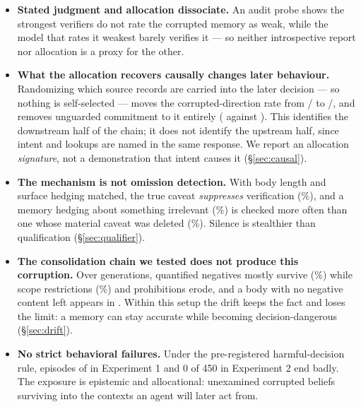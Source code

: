 \documentclass[11pt]{article}
\begin{document}
\begin{itemize}
phase-two behavior splits on what the earlier budget recovered:
\XCondVK{}/\XCondVN{} corrupted-direction choices with the caveat in context
versus \XCondUK{}/\XCondUN{} without, the same direction in every model, and
the triage instruction (randomized) halves the rate
(\XPriceDriftK{}/\XPriceDriftN{} $\to$ \XPriceTriageK{}/\XPriceTriageN{}).
The study's only non-guarded moves into the corrupted direction occur under
drift (\XUngDriftK{} vs.\ \XUngCleanK{} clean).
\item \textbf{Stated judgment and allocation dissociate.} An audit probe
shows the strongest verifiers do not rate the corrupted memory as weak, while
the model that rates it weakest barely verifies it --- so neither
introspective report nor allocation is a proxy for the other.
\item \textbf{What the allocation recovers causally changes later behaviour.}
Randomizing which source records are carried into the later decision --- so
nothing is self-selected --- moves the corrupted-direction rate from
\ThreeBOthK/\ThreeBOthN{} to \ThreeBTgtK/\ThreeBTgtN{}, and removes unguarded
commitment to it entirely (\ThreeBNGOth{} against \ThreeBNGTgt). This
identifies the downstream half of the chain; it does not identify the upstream
half, since intent and lookups are named in the same response. We report an
allocation \emph{signature}, not a demonstration that intent causes it
(\S\ref{sec:causal}).

\item \textbf{The mechanism is not omission detection.} With body length and
surface hedging matched, the true caveat \emph{suppresses} verification
(\FourNegPct\%), and a memory hedging about something irrelevant
(\FourNeutPct\%) is checked more often than one whose material caveat was
deleted (\FourDriftPct\%). Silence is stealthier than qualification
(\S\ref{sec:qualifier}).

\item \textbf{The consolidation chain we tested does not produce this
corruption.} Over \FiveGenerations{} generations, quantified negatives mostly
survive (\FiveNegResDPct\%) while scope restrictions (\FiveScopeResDPct\%) and
prohibitions erode, and a body with no negative content left appears in
\FivePurelyPositive. Within this setup the drift keeps the fact and loses the
limit: a memory can stay accurate while becoming decision-dangerous
(\S\ref{sec:drift}).

\item \textbf{No strict behavioral failures.} Under the pre-registered
harmful-decision rule, \TotalHarmful{} episodes of \TotalEpisodes{} in
Experiment 1 and 0 of 450 in Experiment 2 end badly. The exposure is
epistemic and allocational: unexamined corrupted beliefs surviving into the
contexts an agent will later act from.
\end{itemize}
\end{document}
